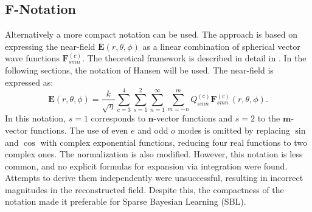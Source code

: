 \documentclass{article}
\begin{document}
\subsection{F-Notation}
Alternatively a more compact notation can be used. The approach is based on expressing the near-field \(\mathbf{E}(r,\theta,\phi)\) as a linear combination of spherical vector wave functions \(\mathbf{F}_{smn}^{(c)}\). The theoretical framework is described in detail in \citet{hansen1988spherical}. In the following sections, the notation of Hansen will be used. The near-field is expressed as:
\begin{equation}
    \label{eq:hansenEfield}
    \mathbf{E}(r,\theta,\phi) = \frac{k}{\sqrt{\eta}}\sum_{c=3}^4\sum_{s=1}^2 \sum_{n=1}^\infty \sum_{m=-n}^m Q_{smn}^{(c)} \mathbf{F}_{smn}^{(c)}(r,\theta,\phi).
\end{equation}
In this notation, \(s=1\) corresponds to \(\mathbf{n}\)-vector functions and \(s=2\) to the \(\mathbf{m}\)-vector functions. The use of even \(e\) and odd \(o\) modes is omitted by replacing \(\sin\) and \(\cos\) with complex exponential functions, reducing four real functions to two complex ones. The normalization is also modified. However, this notation is less common, and no explicit formulas for expansion via integration were found. Attempts to derive them independently were unsuccessful, resulting in incorrect magnitudes in the reconstructed field. Despite this, the compactness of the notation made it preferable for Sparse Bayesian Learning (SBL).
\end{document}
